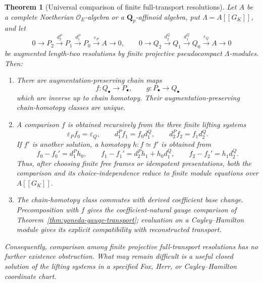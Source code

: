 \documentclass[11pt]{article}
\newtheorem{theorem}{Theorem}[section]
\theoremstyle{definition}
\newcommand{\Qp}{\mathbf Q_p}
\begin{document}
\begin{theorem}[Universal comparison of finite full-transport resolutions]\label{thm:universal-transport-resolution-comparison}
Let $A$ be a complete Noetherian $\mathcal O_E$-algebra or a $\Qp$-affinoid algebra, put
$\Lambda=A[[G_K]]$, and let
\[
0\longrightarrow P_2\xrightarrow{d_2^P}P_1
\xrightarrow{d_1^P}P_0\xrightarrow{\varepsilon_P}A\longrightarrow0,
\qquad
0\longrightarrow Q_2\xrightarrow{d_2^Q}Q_1
\xrightarrow{d_1^Q}Q_0\xrightarrow{\varepsilon_Q}A\longrightarrow0
\]
be augmented length-two resolutions by finite projective pseudocompact
$\Lambda$-modules.  Then:
\begin{enumerate}[label=\textnormal{(\roman*)}]
\item There are augmentation-preserving chain maps
\[
 f:Q_\bullet\longrightarrow P_\bullet,
 \qquad
 g:P_\bullet\longrightarrow Q_\bullet
\]
which are inverse up to chain homotopy.  Their augmentation-preserving
chain-homotopy classes are unique.
\item A comparison $f$ is obtained recursively from the three finite lifting
systems
\begin{equation}\label{eq:transport-resolution-lifting-system}
 \varepsilon_Pf_0=\varepsilon_Q,
 \qquad
 d_1^Pf_1=f_0d_1^Q,
 \qquad
 d_2^Pf_2=f_1d_2^Q.
\end{equation}
If $f'$ is another solution, a homotopy $h:f\simeq f'$ is obtained from
\begin{equation}\label{eq:transport-resolution-homotopy-system}
 f_0-f_0'=d_1^Ph_0,
 \qquad
 f_1-f_1'=d_2^Ph_1+h_0d_1^Q,
 \qquad
 f_2-f_2'=h_1d_2^Q.
\end{equation}
Thus, after choosing finite free frames or idempotent presentations, both the
comparison and its choice-independence reduce to finite module equations over
$A[[G_K]]$.
\item The chain-homotopy class commutes with derived coefficient base change.
Precomposition with $f$ gives the coefficient-natural gauge comparison of
Theorem~\ref{thm:yoneda-gauge-transport}; evaluation on a Cayley--Hamilton
module gives its explicit compatibility with reconstructed transport.
\end{enumerate}
Consequently, comparison among finite projective full-transport resolutions
has no further existence obstruction.  What may remain difficult is a useful
closed solution of the lifting systems in a specified Fox, Herr, or
Cayley--Hamilton coordinate chart.
\end{theorem}
\end{document}
